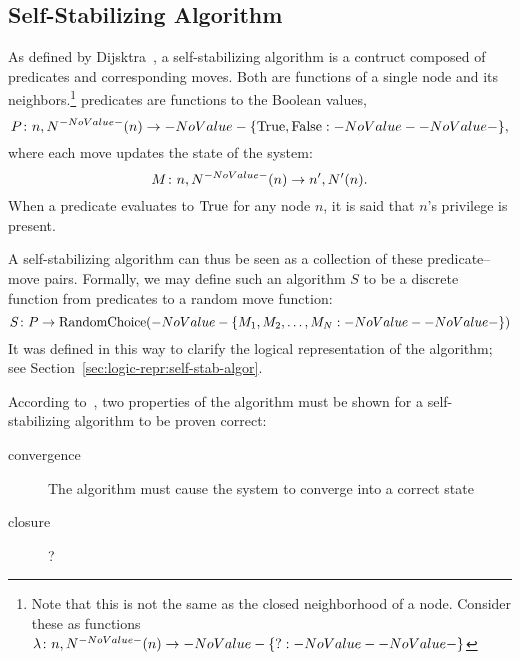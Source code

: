 \subsection{Self-Stabilizing Algorithm}
\label{sec:math-define:self-stab-algor}

As defined by Dijsktra~\autocite{Dijkstra:1974:SSS:361179.361202},
  a self-stabilizing algorithm is a contruct composed of
  \glspl{predicate} and corresponding \glspl{move}.
Both are functions of a single node and its neighbors.\footnote{%
  Note that this is not the same as the closed neighborhood of a node.
  Consider these as functions $\Function{n, \OpenNeighborhood{n}}{\Set ?}$}
\Glspl{predicate} are functions to the Boolean values,
  \begin{equation}
  \label{eq:define-predicate}
  \Function[P]{n, \OpenNeighborhood{n}}{\SetBoolean},
  \end{equation}
  where each \gls{move} updates the state of the system:
  \begin{equation}
  \label{eq:define-move}
  \Function[M]{n, \OpenNeighborhood{n}}{n^\prime, \OpenNeighborhood[\prime]{n}}.
  \end{equation}
When a \gls{predicate} evaluates to $\text{True}$ for any node $n$,
  it is said that $n$'s \gls{privilege} is \gls{present}.

A self-stabilizing algorithm can thus be seen as
  a collection of these \gls{predicate}--\gls{move} pairs.
Formally, we may define such an algorithm $S$ to be a discrete function
  from \glspl{predicate} to a random \gls{move} function:
  \begin{equation}
    \label{eq:define-ssalg}
    \Function[S]{P}{\operatorname{RandomChoice}(\Set{M_1, M_2, \dots, M_N})}
  \end{equation}
It was defined in this way to clarify the logical representation of the algorithm;
  see Section~\ref{sec:logic-repr:self-stab-algor}.

According to~\autocite{arora:closure-and-convergence},
  two properties of the algorithm must be shown 
  for a self-stabilizing algorithm to be proven correct:
\begin{description}
\item[convergence] The algorithm must cause the system to converge into a correct state
\item[closure] ?
\end{description}

